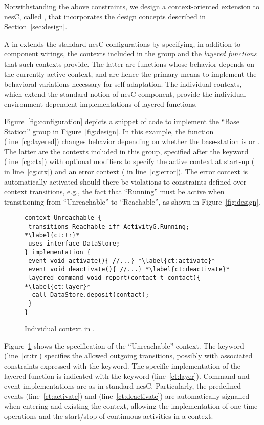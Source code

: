 \fakepar{\conesc} Notwithstanding the above constraints, we design a
context-oriented extension to nesC, called \conesc, that incorporates
the design concepts described in Section~\ref{sec:design}.

A  in \conesc extends the standard nesC
configurations by specifying, in addition to component wirings, the
contexts included in the group and the \emph{layered
  functions}~\cite{cop} that such contexts provide. The latter are
functions whose behavior depends on the currently active context, and
are hence the primary means to implement the behavioral variations
necessary for self-adaptation. The individual contexts, which extend
the standard notion of nesC component, provide the individual
environment-dependent implementations of layered functions.

Figure~\ref{fig:configuration} depicts a snippet of \conesc code to
implement the ``Base Station'' group in Figure~\ref{fig:design}. In
this example, the  function (line~\ref{cg:layered})
changes behavior depending on whether the base-station is
 or . The latter are the contexts
included in this group, specified after the keyword 
(line~\ref{cg:ctx}) with optional modifiers to specify the active
context at start-up ( in line~\ref{cg:ctx}) and an
error context ( in line~\ref{cg:error}). The error
context is automatically activated should there be violations to
constraints defined over context transitions, e.g., the fact that
``Running'' must be active when transitioning from
``Unreachable'' to ``Reachable'', as shown in Figure~\ref{fig:design}.

\begin{figure}[!tb]
\begin{lstlisting}[style=conescframe]
context Unreachable {
 transitions Reachable iff ActivityG.Running; *\label{ct:tr}*
 uses interface DataStore;
} implementation {
 event void activate(){ //...} *\label{ct:activate}*
 event void deactivate(){ //...} *\label{ct:deactivate}*
 layered command void report(contact_t contact){ *\label{ct:layer}*
  call DataStore.deposit(contact);
 }
}
\end{lstlisting}
\vspace{-4mm}
\caption{Individual context in \conesc.}
  \label{fig:context}
\vspace{-2mm}
\end{figure}

Figure~\ref{fig:context} shows the \conesc specification of the
``Unreachable'' context. The keyword 
(line~\ref{ct:tr}) specifies the allowed outgoing transitions,
possibly with associated constraints expressed with the 
keyword. The specific implementation of the layered function is
indicated with the  keyword
(line~\ref{ct:layer}). Command and event implementations are as in
standard nesC. Particularly, the predefined events 
(line~\ref{ct:activate}) and 
(line~\ref{ct:deactivate}) are automatically signalled when entering
and existing the context, allowing the implementation of one-time
operations and the start/stop of continuous activities in a context.

